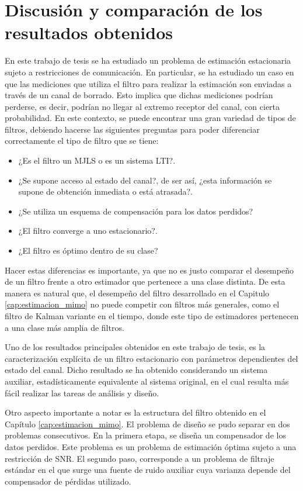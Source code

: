 \section{Discusi\'on y comparaci\'on de los resultados obtenidos}
En este trabajo de tesis se ha estudiado un problema de estimaci\'on estacionaria sujeto a restricciones de comunicaci\'on. En particular, se ha estudiado un caso en que las mediciones que utiliza el filtro para realizar la estimaci\'on son enviadas a trav\'es de un canal de borrado. Esto implica que dichas mediciones podr\'ian perderse, es decir, podr\'ian no llegar al extremo receptor del canal, con cierta probabilidad. En este contexto, se puede encontrar una gran variedad de tipos de filtros, debiendo hacerse las siguientes preguntas para poder diferenciar correctamente el tipo de filtro que se tiene:
\begin{itemize}
\item ¿Es el filtro un MJLS o es un sistema LTI?.
\item ¿Se supone acceso al estado del canal?, de ser as\'i, ¿esta informaci\'on se supone de obtenci\'on inmediata o est\'a atrasada?.
\item ¿Se utiliza un esquema de compensaci\'on para los datos perdidos?
\item ¿El filtro converge a uno estacionario?.
\item ¿El filtro es \'optimo dentro de su clase?
\end{itemize}
Hacer estas diferencias es importante, ya que no es justo comparar el desempe\~no de un filtro frente a otro estimador que pertenece a una clase distinta. De esta manera es natural que, el desempe\~no del filtro desarrollado en el Capitulo \ref{cap:estimacion_mimo} no puede competir con filtros más generales, como el filtro de Kalman variante en el tiempo, donde este tipo de estimadores pertenecen a una clase m\'as amplia de filtros.

Uno de los resultados principales obtenidos en este trabajo de tesis, es la caracterizaci\'on expl\'icita de un filtro estacionario con par\'ametros dependientes del estado del canal. Dicho resultado se ha obtenido considerando un sistema auxiliar, estad\'isticamente equivalente al sistema original, en el cual resulta m\'as f\'acil realizar las tareas de an\'alisis y dise\~no. 

Otro aspecto importante a notar es la estructura del filtro obtenido en el Cap\'itulo \ref{cap:estimacion_mimo}. El problema de dise\~no se pudo separar en dos problemas consecutivos. En la primera etapa, se dise\~na un compensador de los datos perdidos. Este problema es un problema de estimaci\'on \'optima sujeto a una restricci\'on de SNR. El segundo paso, corresponde a un problema de filtraje est\'andar en el que surge una fuente de ruido auxiliar cuya varianza depende del compensador de p\'erdidas utilizado.

